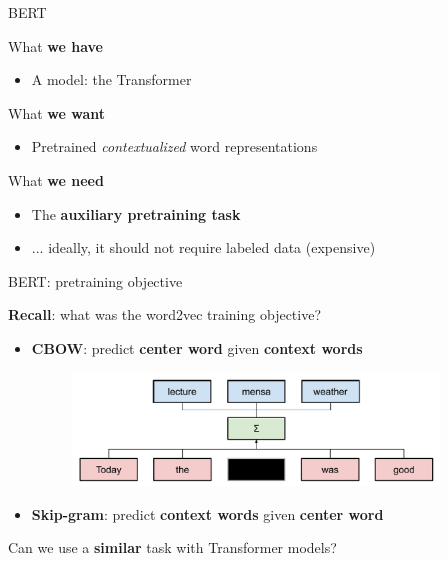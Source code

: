 \documentclass[12pt,aspectratio=169,handout]{beamer}
\begin{document}
\begin{frame}{BERT}

	What \textbf{we have}
	\begin{itemize}
		\item A model: the Transformer
	\end{itemize}

	\pause
	What \textbf{we want}
	\begin{itemize}
		\item Pretrained \textit{contextualized} word representations
	\end{itemize}

	\pause
	What \textbf{we need}
	\begin{itemize}
		\item The \textbf{auxiliary pretraining task}
		\pause
		\item ... ideally, it should not require labeled data (expensive)
	\end{itemize}

\end{frame}

\begin{frame}{BERT: pretraining objective}

	\textbf{Recall}: what was the word2vec training objective?
	\pause
	\begin{itemize}
		\item \textbf{CBOW}: predict \textbf{center word} given \textbf{context words}
		\pause
		\begin{figure}[h]
			\includegraphics[height=3cm]{word2vec_cbow.pdf}
		\end{figure}
		\pause
		\item \textbf{Skip-gram}: predict \textbf{context words} given \textbf{center word}
	\end{itemize}
	\pause
	Can we use a \textbf{similar} task with Transformer models?
\end{frame}
\end{document}
